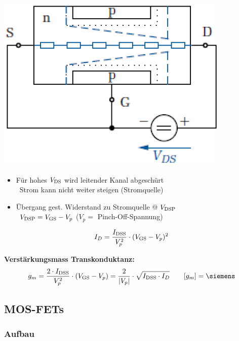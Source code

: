 \begin{minipage}[t]{0.3\columnwidth}
    \includegraphics[align=t, width=\columnwidth]{images/fet_aufbau_saettigung.png}
\end{minipage}
\hfill
\begin{minipage}[t]{0.68\columnwidth}
    \begin{itemize}
        \item Für hohes $V_{\rm DS}$ wird leitender Kanal abgeschürt \\
            \textrightarrow\ Strom kann nicht weiter steigen (Stromquelle)
        \item Übergang gest. Widerstand zu Stromquelle @ $V_{\rm DSP}$ \\
        \textrightarrow\ $V_{\rm DSP} = V_{\rm GS} - V_p$ ($V_p =$ Pinch-Off-Spannung)
    \end{itemize}

    $$ I_D = \frac{ I_{\rm DSS}}{V_p^2} \cdot ( V_{\rm GS} - V_p )^2 $$
\end{minipage}

\vspace{0.2cm}
\textbf{Verstärkungsmass Transkonduktanz:}
$$  g_m = \frac{ 2 \cdot I_{\rm DSS}}{V_p^2} \cdot ( V_{\rm GS} - V_p ) = \frac{2}{| V_p |} \cdot \sqrt{I_{\rm DSS} \cdot I_D} \qquad [g_m] = \siemens $$


\subsection{MOS-FETs}

\subsubsection{Aufbau}

